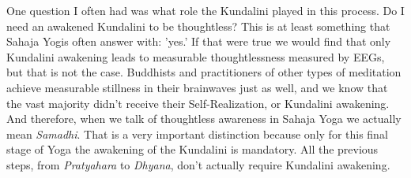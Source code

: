 \documentclass[12pt]{article}
\begin{document}

One question I often had was what role the Kundalini played in this process.
Do I need an awakened Kundalini to be thoughtless?
This is at least something that Sahaja Yogis often answer with: 'yes.'
If that were true we would find that only Kundalini awakening leads to measurable thoughtlessness measured by EEGs, but that is not the case.
Buddhists and practitioners of other types of meditation achieve measurable stillness in their brainwaves just as well, and we know that the vast majority didn't receive their Self-Realization, or Kundalini awakening.
And therefore, when we talk of thoughtless awareness in Sahaja Yoga we actually mean \textit{Samadhi}.
That is a very important distinction because only for this final stage of Yoga the awakening of the Kundalini is mandatory.
All the previous steps, from \textit{Pratyahara} to \textit{Dhyana}, don't actually require Kundalini awakening.



\end{document}
